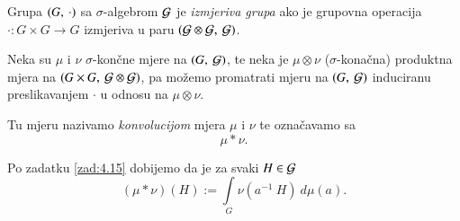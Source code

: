 \begin{defn}    \label{defn:7.11-1}
    Grupa $({G}, \: {\cdot})$ sa $\sigma$-algebrom $\mathcal{G}$ je \emph{izmjeriva grupa} ako je grupovna operacija $\cdot : G \times G \to G$ izmjeriva u paru $({\mathcal{G} \otimes \mathcal{G}}, \: {\mathcal{G}})$.
\end{defn}

\begin{defn}    \label{defn:7.11-2}
    Neka su $\mu$ i $\nu$ $\sigma$-kon\v cne mjere na $({G}, \: {\mathcal{G}})$, te neka je $\mu \otimes \nu$ ($\sigma$-kona\v cna) produktna mjera na $({G \times G}, \: {\mathcal{G} \otimes \mathcal{G}})$, pa mo\v zemo promatrati mjeru na $({G}, \: {\mathcal{G}})$ induciranu preslikavanjem $\cdot$ u odnosu na $\mu \otimes \nu$.
    
    Tu mjeru nazivamo \emph{konvolucijom} mjera $\mu$ i $\nu$ te ozna\v cavamo sa
    \begin{equation*}
        \mu * \nu.
    \end{equation*}
\end{defn}

Po zadatku \ref{zad:4.15} dobijemo da je za svaki $H \in \mathcal{G}$
\begin{equation*}   \label{jed:7.12}
    (\mu * \nu)(H) := \int\limits_G \nu (a^{-1} \: H) \: d \mu (a).
\end{equation*}

